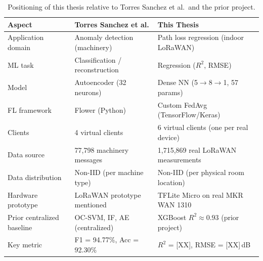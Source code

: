 \begin{table}[H]
  \centering
  \caption{Positioning of this thesis relative to Torres Sanchez et al.\ and the prior project.}
  \label{tab:torres-comparison}
  \begin{tabular}{p{3.8cm} p{3.8cm} p{3.8cm}}
    \toprule
    \textbf{Aspect} &
    \textbf{Torres Sanchez et al.} &
    \textbf{This Thesis} \\
    \midrule
    Application domain &
      Anomaly detection (machinery) &
      Path loss regression (indoor LoRaWAN) \\[4pt]
    ML task &
      Classification / reconstruction &
      Regression ($R^2$, RMSE) \\[4pt]
    Model &
      Autoencoder (32 neurons) &
      Dense NN (5$\to$8$\to$1, 57 params) \\[4pt]
    FL framework &
      Flower (Python) &
      Custom FedAvg (TensorFlow/Keras) \\[4pt]
    Clients &
      4 virtual clients &
      6 virtual clients (one per real device) \\[4pt]
    Data source &
      77,798 machinery messages &
      1,715,869 real LoRaWAN measurements \\[4pt]
    Data distribution &
      Non-IID (per machine type) &
      Non-IID (per physical room location) \\[4pt]
    Hardware prototype &
      LoRaWAN prototype mentioned &
      TFLite Micro on real MKR WAN 1310 \\[4pt]
    Prior centralized baseline &
      OC-SVM, IF, AE (centralized) &
      XGBoost $R^2 \approx 0.93$ (prior project) \\[4pt]
    Key metric &
      F1 = 94.77\%, Acc = 92.30\% &
      $R^2$ = [XX], RMSE = [XX]\,dB \\
    \bottomrule
  \end{tabular}
\end{table}

